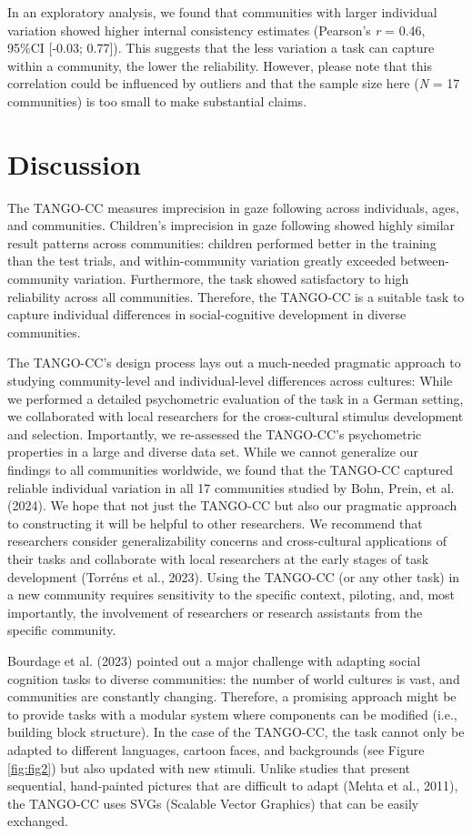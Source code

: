 \documentclass[
  man,floatsintext]{apa7}
\begin{document}
In an exploratory analysis, we found that communities with larger individual variation showed higher internal consistency estimates (Pearson's \emph{r} = 0.46, 95\%CI {[}-0.03; 0.77{]}).
This suggests that the less variation a task can capture within a community, the lower the reliability.
However, please note that this correlation could be influenced by outliers and that the sample size here (\emph{N} = 17 communities) is too small to make substantial claims.

\section{Discussion}\label{discussion}

The TANGO-CC measures imprecision in gaze following across individuals, ages, and communities.
Children's imprecision in gaze following showed highly similar result patterns across communities: children performed better in the training than the test trials, and within-community variation greatly exceeded between-community variation.
Furthermore, the task showed satisfactory to high reliability across all communities.
Therefore, the TANGO-CC is a suitable task to capture individual differences in social-cognitive development in diverse communities.

The TANGO-CC's design process lays out a much-needed pragmatic approach to studying community-level and individual-level differences across cultures:
While we performed a detailed psychometric evaluation of the task in a German setting, we collaborated with local researchers for the cross-cultural stimulus development and selection.
Importantly, we re-assessed the TANGO-CC's psychometric properties in a large and diverse data set.
While we cannot generalize our findings to all communities worldwide, we found that the TANGO-CC captured reliable individual variation in all 17 communities studied by Bohn, Prein, et al. (2024).
We hope that not just the TANGO-CC but also our pragmatic approach to constructing it will be helpful to other researchers.
We recommend that researchers consider generalizability concerns and cross-cultural applications of their tasks and collaborate with local researchers at the early stages of task development (Torréns et al., 2023).
Using the TANGO-CC (or any other task) in a new community requires sensitivity to the specific context, piloting, and, most importantly, the involvement of researchers or research assistants from the specific community.

Bourdage et al. (2023) pointed out a major challenge with adapting social cognition tasks to diverse communities: the number of world cultures is vast, and communities are constantly changing.
Therefore, a promising approach might be to provide tasks with a modular system where components can be modified (i.e., building block structure).
In the case of the TANGO-CC, the task cannot only be adapted to different languages, cartoon faces, and backgrounds (see Figure \ref{fig:fig2}) but also updated with new stimuli.
Unlike studies that present sequential, hand-painted pictures that are difficult to adapt (Mehta et al., 2011), the TANGO-CC uses SVGs (Scalable Vector Graphics) that can be easily exchanged.
\end{document}
